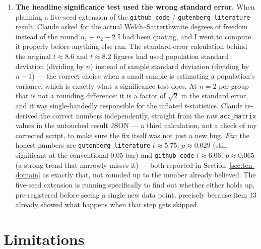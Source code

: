 \documentclass[11pt,letterpaper]{article}
\begin{document}
\begin{enumerate}[leftmargin=1.6em,itemsep=0.5em]
\item \textbf{The headline significance test used the wrong standard error.} When planning a five-seed extension of the \texttt{github\_code} / \texttt{gutenberg\_literature} result, Claude asked for the actual Welch--Satterthwaite degrees of freedom instead of the round $n_1+n_2-2$ I had been quoting, and I went to compute it properly before anything else ran. The standard-error calculation behind the original $t\approx8.6$ and $t\approx8.2$ figures had used population standard deviation (dividing by $n$) instead of sample standard deviation (dividing by $n-1$) --- the correct choice when a small sample is estimating a population's variance, which is exactly what a significance test does. At $n=2$ per group that is not a rounding difference: it is a factor of $\sqrt{2}$ in the standard error, and it was single-handedly responsible for the inflated $t$-statistics. Claude re-derived the correct numbers independently, straight from the raw \texttt{acc\_matrix} values in the untouched result JSON --- a third calculation, not a check of my corrected script, to make sure the fix itself was not just a new bug. \emph{Fix:} the honest numbers are \texttt{gutenberg\_literature} $t\approx5.75$, $p\approx0.029$ (still significant at the conventional 0.05 bar) and \texttt{github\_code} $t\approx6.06$, $p\approx0.065$ (a strong trend that narrowly misses it) --- both reported in Section~\ref{sec:ten-domain} as exactly that, not rounded up to the number already believed. The five-seed extension is running specifically to find out whether either holds up, pre-registered before seeing a single new data point, precisely because item 13 already showed what happens when that step gets skipped.
\end{enumerate}

\section{Limitations}
\label{sec:limitations}
\end{document}
